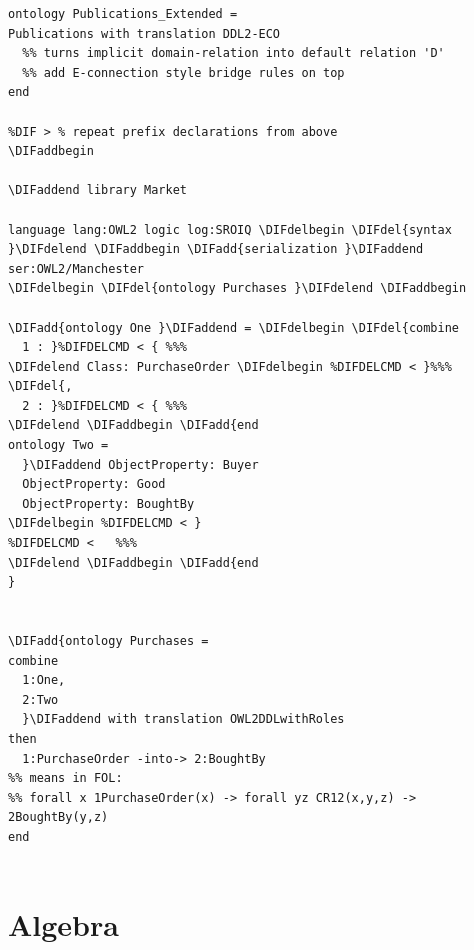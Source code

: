 \documentclass[10pt,fleqn,final]{scrreprt}
\newcommand{\sclause}[1]{\section{#1}}
\providecommand{\DIFadd}[1]{{\protect\color{blue}\uwave{#1}}} %
\providecommand{\DIFdel}[1]{{\protect\color{red}\sout{#1}}}                      %
\providecommand{\DIFaddbegin}{} %
\providecommand{\DIFaddend}{} %
\providecommand{\DIFdelbegin}{} %
\providecommand{\DIFdelend}{} %
\begin{document}
\begin{lstlisting}[basicstyle=\ttfamily,language=dolText,alsolanguage=OWL2manchester,escapechar=@,mathescape]
ontology Publications_Extended =
Publications with translation DDL2-ECO
  %% turns implicit domain-relation into default relation 'D'
  %% add E-connection style bridge rules on top
end

%DIF > % repeat prefix declarations from above
\DIFaddbegin 

\DIFaddend library Market

language lang:OWL2 logic log:SROIQ \DIFdelbegin \DIFdel{syntax }\DIFdelend \DIFaddbegin \DIFadd{serialization }\DIFaddend ser:OWL2/Manchester
\DIFdelbegin \DIFdel{ontology Purchases }\DIFdelend \DIFaddbegin 

\DIFadd{ontology One }\DIFaddend = \DIFdelbegin \DIFdel{combine
  1 : }%DIFDELCMD < { %%%
\DIFdelend Class: PurchaseOrder \DIFdelbegin %DIFDELCMD < }%%%
\DIFdel{,
  2 : }%DIFDELCMD < { %%%
\DIFdelend \DIFaddbegin \DIFadd{end
ontology Two =
  }\DIFaddend ObjectProperty: Buyer
  ObjectProperty: Good
  ObjectProperty: BoughtBy
\DIFdelbegin %DIFDELCMD < }
%DIFDELCMD <   %%%
\DIFdelend \DIFaddbegin \DIFadd{end
}


\DIFadd{ontology Purchases =
combine
  1:One,
  2:Two
  }\DIFaddend with translation OWL2DDLwithRoles
then
  1:PurchaseOrder -into-> 2:BoughtBy
%% means in FOL: 
%% forall x 1PurchaseOrder(x) -> forall yz CR12(x,y,z) -> 2BoughtBy(y,z)
end


\end{lstlisting}


\sclause{Algebra}\DIFaddbegin \label{ex:algebra}
\DIFaddend 
\end{document}
